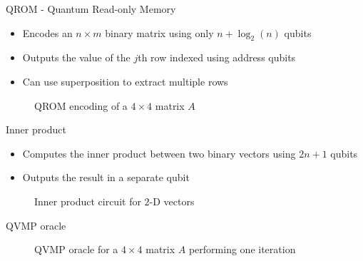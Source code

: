 \documentclass[10pt]{beamer}
\begin{document}
\begin{frame}{QROM - Quantum Read-only Memory}
  \begin{itemize}
    \item Encodes an $n \times m$ binary matrix using only $n + \log_2(n)$ qubits
    \item Outputs the value of the $j$th row indexed using address qubits
    \item Can use superposition to extract multiple rows
  \end{itemize}
  \begin{figure}
      \centering
      \begin{subfigure}{\textwidth}
        \centering
        
      \end{subfigure}
      \caption{QROM encoding of a $4 \times 4$ matrix $A$}
      \label{fig:qrom_4x4}
  \end{figure}
\end{frame}

\begin{frame}{Inner product}
  \begin{itemize}
    \item Computes the inner product between two binary vectors using $2n + 1$
      qubits
    \item Outputs the result in a separate qubit
  \end{itemize}
  \begin{figure}
    \centering
    
    \caption{Inner product circuit for $2$-D vectors}
    \label{fig:inner_product}
  \end{figure}
\end{frame}

\begin{frame}{QVMP oracle}
  \begin{figure}
    \centering
    \scalebox{0.7}{}
    \caption{QVMP oracle for a $4 \times 4$ matrix $A$ performing one iteration}
    \label{fig:qvmp_oracle}
  \end{figure}
\end{frame}
\end{document}
